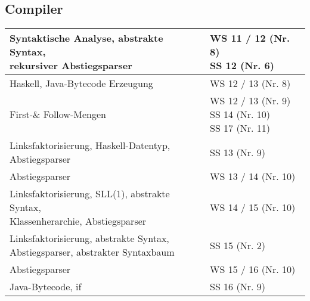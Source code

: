 \subsection*{Compiler}
\begin{table}[h]
	\centering
	\begin{tabular}{l|l}
		\multlineTable{Syntaktische Analyse, abstrakte Syntax,\\ rekursiver Abstiegsparser}
		& \multlineTable{WS 11 / 12 (Nr. 8)\\ SS 12 (Nr. 6)} \\ \hline	
		
		Haskell, Java-Bytecode Erzeugung
		& WS 12 / 13 (Nr. 8) \\ \hline
		
		First-\& Follow-Mengen 
		& \multlineTable{WS 12 / 13 (Nr. 9)\\ SS 14 (Nr. 10)\\ SS 17 (Nr. 11)} \\ \hline	
		
		\multlineTable{Linksfaktorisierung, Haskell-Datentyp,\\ Abstiegsparser }
		& SS 13 (Nr. 9) \\ \hline
		
		Abstiegsparser 
		& WS 13 / 14 (Nr. 10) \\ \hline	
		
		\multlineTable{Linksfaktorisierung, SLL(1), abstrakte Syntax,\\ Klassenherarchie, Abstiegsparser}
		& WS 14 / 15 (Nr. 10) \\ \hline	
		
		\multlineTable{Linksfaktorisierung, abstrakte Syntax,\\ Abstiegsparser, abstrakter Syntaxbaum}
		& SS 15 (Nr. 2) \\ \hline
		
		Abstiegsparser 
		& WS 15 / 16 (Nr. 10) \\ \hline
		
		Java-Bytecode, if
		& SS 16 (Nr. 9) \\ \hline
	\end{tabular}
\end{table}
\FloatBarrier